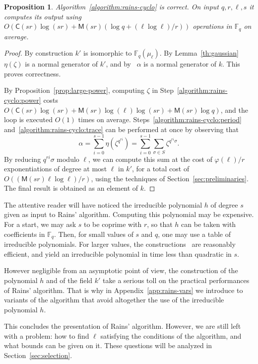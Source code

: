 \documentclass[12pt]{article}
\theoremstyle{plain}
\newtheorem{proposition}[theorem]{Proposition}
\theoremstyle{definition}
\def\F{\ensuremath{\mathbb{F}}}
\def\MM{\ensuremath{\mathsf{M}}}
\def\CC{\ensuremath{\mathsf{C}}}
\def\euler{\ensuremath{\varphi}}
\newcounter{algorithm}
\begin{document}
\begin{proposition}
  Algorithm~\ref{algorithm:rains-cyclo} is correct. On input
  $q,r,\ell,s$ it computes its output using
  $O(\CC(sr)\log(sr) + \MM(sr)(\log q + (\ell\log\ell)/r))$ operations in $\F_q$ on average.
\end{proposition}
\begin{proof}
  By construction $k'$ is isomorphic to $\F_q(\mu_\ell)$. By
  Lemma~\ref{th:gaussian} $\eta(\zeta)$ is a normal generator of $k'$,
  and by~\cite[Prop.~5.2.3.1]{mullen2013handbook} $\alpha$ is a
  normal generator of $k$. This proves correctness.

  By Proposition~\ref{prop:large-power}, computing $\zeta$
  in Step~\ref{algorithm:rains-cyclo:power}
  costs $O(\CC(sr)\log(sr)+\MM(sr)\log(\ell)\log(sr)+\MM(sr)\log q)$,
  and the loop is executed $O(1)$ times on average. 
  Steps~\ref{algorithm:rains-cyclo:period}
  and~\ref{algorithm:rains-cyclo:trace} can be performed at once by
  observing that
  \[\alpha = \sum_{i=0}^{s-1}\eta(\zeta^{q^{ri}})= \sum_{i=0}^{s-1}\sum_{\sigma\in S}\zeta^{q^{ri}\sigma}.\]
  By reducing $q^{ri}\sigma$ modulo $\ell$, we can compute this sum at
  the cost of $\euler(\ell)/r$ exponentiations of degree at most
  $\ell$ in $k'$, for a total cost of
  $O((\MM(sr)\ell\log\ell)/r)$,
  using the techniques of Section~\ref{sec:preliminaries}.
  The final result is obtained as an element of $k$.
\end{proof}

The attentive reader will have noticed the irreducible polynomial $h$
of degree $s$ given as input to Rains' algorithm. Computing this
polynomial may be expensive. For a start, we may ask $s$ to be coprime
with $r$, so that $h$ can be taken with coefficients in $\F_q$. Then,
for small values of $s$ and $q$, one may use a table of irreducible
polynomials. For larger values, the
constructions~\cite{couveignes+lercier11,DeDoSc13,DeDoSc2014}
are reasonably efficient, and yield an irreducible polynomial in time
less than quadratic in $s$.

However negligible from an asymptotic point of view, the construction
of the polynomial $h$ and of the field $k'$ take a serious toll on the
practical performances of Rains' algorithm. That is why in
Appendix~\ref{app:rains-vars} we introduce to variants of the
algorithm that avoid altogether the use of the irreducible polynomial
$h$.

This concludes the presentation of Rains' algorithm. However, we are
still left with a problem: how to find $\ell$ satisfying the
conditions of the algorithm, and what bounds can be given on it. These
questions will be analyzed in Section~\ref{sec:selection}.
\end{document}
